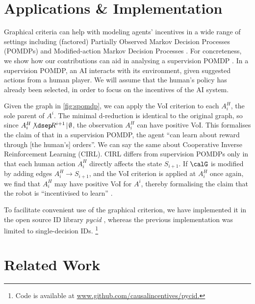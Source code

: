 




\section{Applications \& Implementation} \label{sec:applications}

Graphical criteria can help with modeling agents' incentives in a 
wide range of settings including 
(factored) Partially Observed Markov Decision Processes (POMDPs)
and Modified-action Markov Decision Processes \citep{langlois2021rl}.
For concreteness, 
we show how our contributions can aid in analysing a supervision POMDP \citep{Milli2017}.
In a supervision POMDP, an AI interacts with its environment, given suggested actions from a 
human player.
We will assume that the human's policy has already been selected, in order to focus on 
the incentives of the AI system.~



Given the graph in \cref{fig:spomdp}, we can apply the VoI criterion to each $A^H_i$, the sole parent of $A^i$.
The minimal d-reduction is identical to the original graph, 
so since $A^H_i \!\not \dsep\! R^{i+1} \!\mid\! \emptyset$, 
the observation $A^H_i$ can have positive VoI.
This formalises the claim of \citet{Milli2017} that in a supervision POMDP, the agent ``can learn about reward through [the human's] orders''. 
We can say the same about Cooperative Inverse Reinforcement Learning (CIRL).
CIRL differs from supervision POMDPs only in that each human action 
$A^H_i$
directly 
affects the state $S_{i+1}$. 
If $\calG$ is modified by adding edges $A^H_i \to S_{i+1}$,
and the VoI criterion is applied at $A^H_i$ once again,
we find that 
$A^H_i$ may have positive VoI for $A^i$, 
thereby formalising
the claim that the robot is
``incentivised to learn''
\citep[Remark 1]{Hadfield-Menell2016cirl}.~


To facilitate convenient use of the graphical criterion, 
we have implemented it in the open source ID library \emph{pycid} \citep{Fox2021pycid}, 
whereas the previous implementation was limited to single-decision IDs.%
\footnote{Code is available at {\url{www.github.com/causalincentives/pycid.}}}~

\section{Related Work} \label{sec:related-work}


